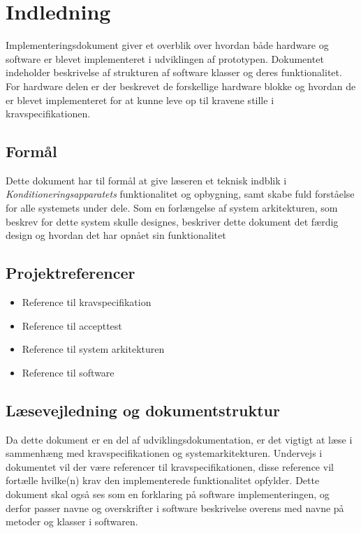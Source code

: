 	\chapter{Indledning}
	Implementeringsdokument giver et overblik over hvordan både hardware og software er blevet implementeret i udviklingen af prototypen. Dokumentet indeholder beskrivelse af strukturen af software klasser og deres funktionalitet. For hardware delen er der beskrevet de forskellige hardware blokke og hvordan de er blevet implementeret for at kunne leve op til kravene stille i kravspecifikationen. 
	
	\section{Formål}
	Dette dokument har til formål at give læseren et teknisk indblik i \textit{Konditioneringsapparatets} funktionalitet og opbygning, samt skabe fuld forståelse for alle systemets under dele. Som en forlængelse af system arkitekturen, som beskrev for dette system skulle designes, beskriver dette dokument det færdig design og hvordan det har opnået sin funktionalitet
	
	\section{Projektreferencer}
	\begin{itemize}
		\item Reference til kravspecifikation
		\item Reference til accepttest
		\item Reference til system arkitekturen
		\item Reference til software
	\end{itemize}
	
	\section{Læsevejledning og dokumentstruktur}
	Da dette dokument er en del af udviklingsdokumentation, er det vigtigt at læse i sammenhæng med kravspecifikationen og systemarkitekturen. Undervejs i dokumentet vil der være referencer til kravspecifikationen, disse reference vil fortælle hvilke(n) krav den implementerede funktionalitet opfylder. Dette dokument skal også ses som en forklaring på software implementeringen, og derfor passer navne og overskrifter i software beskrivelse overens med navne på metoder og klasser i softwaren. 

